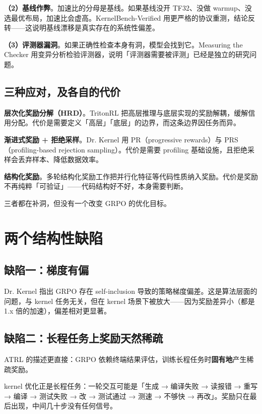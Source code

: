 \textbf{（2）基线作弊}。加速比的分母是基线。如果基线没开 TF32、没做 warmup、没选最优布局，加速比会虚高。KernelBench-Verified 用更严格的协议重测，结论反转——这说明基线漂移是真实存在的系统性偏差。

\textbf{（3）评测器漏洞}。如果正确性检查本身有洞，模型会找到它。Measuring the Checker 用变异分析检验评测器，说明「评测器需要被评测」已经是独立的研究问题。

\subsection{三种应对，及各自的代价}

\textbf{层次化奖励分解（HRD）}。TritonRL 把高层推理与底层实现的奖励解耦，缓解信用分配。代价是需要定义「高层」「底层」的边界，而这条边界因任务而异。

\textbf{渐进式奖励 + 拒绝采样}。Dr. Kernel 用 PR（progressive rewards）与 PRS（profiling-based rejection sampling）。代价是需要 profiling 基础设施，且拒绝采样会丢弃样本、降低数据效率。

\textbf{结构化奖励}。多轮结构化奖励工作把并行化特征等代码性质纳入奖励。代价是奖励不再纯粹「可验证」——代码结构好不好，本身需要判断。

三者都在补洞，但没有一个改变 GRPO 的优化目标。

\section{两个结构性缺陷}

\subsection{缺陷一：梯度有偏}

Dr. Kernel 指出 GRPO 存在 self-inclusion 导致的策略梯度偏差。这是算法层面的问题，与 kernel 任务无关，但在 kernel 场景下被放大——因为奖励差异小（都是 1.x 倍的加速），偏差相对更显著。

\subsection{缺陷二：长程任务上奖励天然稀疏}

ATRL 的描述更直接：GRPO 依赖终端结果评估，训练长程任务时\textbf{固有地}产生稀疏奖励。

kernel 优化正是长程任务：一轮交互可能是「生成 → 编译失败 → 读报错 → 重写 → 编译 → 测试失败 → 改 → 测试通过 → 测速 → 不够快 → 再改」。奖励只在最后出现，中间几十步没有任何信号。

